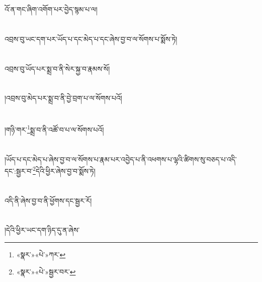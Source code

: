 འོ་ན་གང་ཞིག་འགོག་པར་བྱེད་སྙམ་པ་ལ།\chapter{ }འབྲས་བུ་ཡང་དག་པར་ཡོད་པ་དང་མེད་པ་དང་ཞེས་བྱ་བ་ལ་སོགས་པ་སྨོས་ཏེ།\chapter{ }འབྲས་བུ་ཡོད་པར་སྨྲ་བ་ནི་སེར་སྐྱ་བ་རྣམས་སོ།\chapter{ }།འབྲས་བུ་མེད་པར་སྨྲ་བ་ནི་བྱེ་བྲག་པ་ལ་སོགས་པའོ།\chapter{ }།གཉི་གར་\footnote{«སྣར་»«པེ་»ཀར་}སྨྲ་བ་ནི་འཚོ་བ་པ་ལ་སོགས་པའོ།\chapter{ }།ཡོད་པ་དང་མེད་པ་ཞེས་བྱ་བ་ལ་སོགས་པ་རྣམ་པར་འབྱེད་པ་ནི་འཕགས་པ་ལྷའི་ཚིགས་སུ་བཅད་པ་འདི་དང་:སྦྱར་བ་\footnote{«སྣར་»«པེ་»སྦྱར་བར་}དེའི་ཕྱིར་ཞེས་བྱ་བ་སྨོས་ཏེ།\chapter{ }འདི་ནི་ཞེས་བྱ་བ་ནི་ཕྱོགས་དང་སྦྱར་རོ།\chapter{ }།དེའི་ཕྱིར་ཡང་དག་ཉིད་དུ་ན་ཞེས་